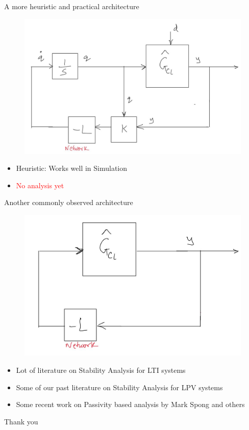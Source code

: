 \documentclass{beamer}
\begin{document}
\begin{frame}{A more heuristic and practical architecture}
	
\begin{figure}
	\includegraphics[height=0.45\textheight]{figures/cons_combined.jpg}
\end{figure}
\begin{itemize}
	\item Heuristic: Works well in Simulation
	\item \textcolor{red}{No analysis yet}
\end{itemize}
\end{frame}
\begin{frame}{Another commonly observed architecture}
	
	\begin{figure}
		\includegraphics[height=0.45\textheight]{figures/general_arch_literture.jpg}
	\end{figure}
	\begin{itemize}
		\item Lot of literature on Stability Analysis for LTI systems
		\item Some of our past literature on Stability Analysis for LPV systems
		\item Some recent work on Passivity based analysis by Mark Spong and others
	\end{itemize}
\end{frame}
\begin{frame}{}
\begin{center}
    \huge{Thank you}
\end{center}
\end{frame}
\end{document}
